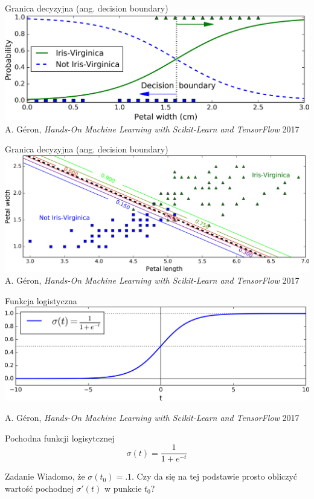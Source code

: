 \documentclass{sa}
\begin{document}
\begin{frame}{Granica decyzyjna (ang. decision boundary)}
\includegraphics[width=\textwidth]{iris-1attr-decboundary.png}
{\vfill\footnotesize A. Géron, \emph{Hands-On Machine Learning with Scikit-Learn and TensorFlow} 2017}
\end{frame}

\begin{frame}{Granica decyzyjna (ang. decision boundary)}
\includegraphics[width=\textwidth]{iris-2attr-decboundary.png}
{\vfill\footnotesize A. Géron, \emph{Hands-On Machine Learning with Scikit-Learn and TensorFlow} 2017}
\end{frame}

\begin{frame}{Funkcja logistyczna}
\includegraphics[width=\textwidth]{logistic-function.png}

{\vfill\footnotesize A. Géron, \emph{Hands-On Machine Learning with Scikit-Learn and TensorFlow} 2017}
\end{frame}

\begin{frame}{Pochodna funkcji logisytcznej}
\[ \sigma(t) = \frac{1}{1+e^{-t}} \]

\begin{block}{Zadanie}
Wiadomo, że $\sigma(t_0)=.1$. Czy da się na tej podstawie prosto obliczyć wartość pochodnej $\sigma'(t)$ w punkcie $t_0$?
\end{block}

\end{frame}
\end{document}

